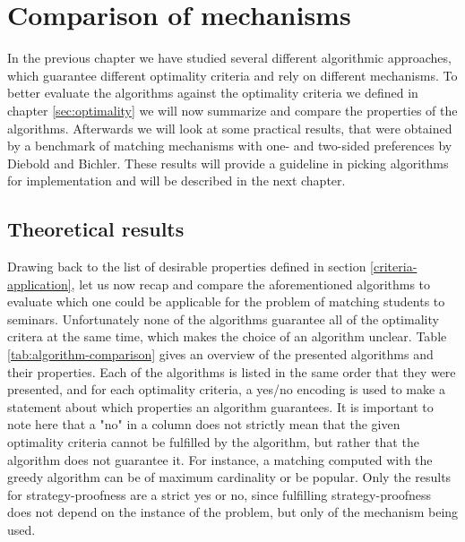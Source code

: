 \section{Comparison of mechanisms}
In the previous chapter we have studied several different algorithmic approaches, which guarantee different optimality criteria and rely on different mechanisms. To better evaluate the algorithms against the optimality criteria we defined in chapter \ref{sec:optimality} we will now summarize and compare the properties of the algorithms. Afterwards we will look at some practical results, that were obtained by a benchmark of matching mechanisms with one- and two-sided preferences by Diebold and Bichler.\cite{DieboldBenchmark} These results will provide a guideline in picking algorithms for implementation and will be described in the next chapter.

\subsection{Theoretical results}
Drawing back to the list of desirable properties defined in section \ref{criteria-application}, let us now recap and compare the aforementioned algorithms to evaluate which one could be applicable for the problem of matching students to seminars. Unfortunately none of the algorithms guarantee all of the optimality critera at the same time, which makes the choice of an algorithm unclear. Table \ref{tab:algorithm-comparison} gives an overview of the presented algorithms and their properties. Each of the algorithms is listed in the same order that they were presented, and for each optimality criteria, a yes/no encoding is used to make a statement about which properties an algorithm guarantees. It is important to note here that a "no" in a column does not strictly mean that the given optimality criteria cannot be fulfilled by the algorithm, but rather that the algorithm does not guarantee it. For instance, a matching computed with the greedy algorithm can be of maximum cardinality or be popular. Only the results for strategy-proofness are a strict yes or no, since fulfilling strategy-proofness does not depend on the instance of the problem, but only of the mechanism being used. 


